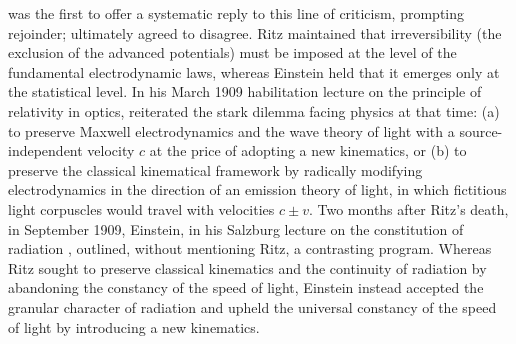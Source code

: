 \documentclass[submitted,12pt]{article}
\begin{document}
\citet{Einstein1909} was the first to offer a systematic reply to this line of criticism, prompting  rejoinder; \citet{RitzEinstein1909b} ultimately agreed to disagree. Ritz maintained that irreversibility (the exclusion of the advanced potentials) must be imposed at the level of the fundamental electrodynamic laws, whereas Einstein held that it emerges only at the statistical level. In his March 1909 habilitation lecture on the principle of relativity in optics, \citet{Ritz1909} reiterated the stark dilemma facing physics at that time: (a) to preserve Maxwell electrodynamics and the wave theory of light with a source-independent velocity $c$ at the price of adopting a new kinematics, or (b) to preserve the classical kinematical framework by radically modifying electrodynamics in the direction of an emission theory of light, in which fictitious light corpuscles would travel with velocities $c \pm v$. Two months after Ritz’s death, in September 1909, Einstein, in his Salzburg lecture on the constitution of radiation \citep{Einstein1909a}, outlined, without mentioning Ritz, a contrasting program. Whereas Ritz sought to preserve classical kinematics and the continuity of radiation by abandoning the constancy of the speed of light, Einstein instead accepted the granular character of radiation and upheld the universal constancy of the speed of light by introducing a new kinematics.





\end{document}
